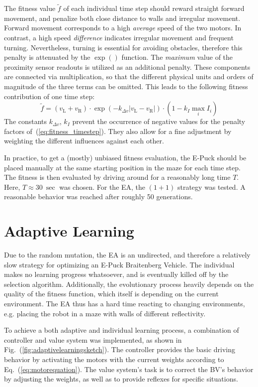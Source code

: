 \documentclass[a4paper]{jacow}
\begin{document}
The fitness value $\tilde{f}$ of each individual time step should reward straight forward movement, and penalize both close distance to walls and irregular movement. Forward movement corresponds to a high \emph{average} speed of the two motors. In contrast, a high speed \emph{difference} indicates irregular movement and frequent turning. Nevertheless, turning is essential for avoiding obstacles, therefore this penalty is attenuated by the $\exp()$ function. The \emph{maximum} value of the proximity sensor readouts is utilized as an additional penalty. These components are connected via multiplication, so that the different physical units and orders of magnitude of the three terms can be omitted. This leads to the following fitness contribution of one time step:
\begin{equation}
	\tilde{f} = \left( v_\mathrm{L} + v_\mathrm{R} \right) \cdot \exp\left( - k_{\Delta v}|v_\mathrm{L}-v_\mathrm{R}| \right) \cdot \left(1- k_{I} \max\limits_i I_i\right)
	\label{eq:fitness_timestep} 
\end{equation}
The constants $k_{\Delta v}$, $k_I$ prevent the occurrence of negative values for the penalty factors of~(\ref{eq:fitness_timestep}). They also allow for a fine adjustment by weighting the different influences against each other.

In practice, to get a (mostly) unbiased fitness evaluation, the E-Puck should be placed manually at the same starting position in the maze for each time step. The fitness is then evaluated by driving around for a reasonably long time $T$. Here, $T\approx\SI{30}{\sec}$ was chosen. For the EA, the $(1+1)$ strategy was tested. A reasonable behavior was reached after roughly 50 generations.


\section{Adaptive Learning}

Due to the random mutation, the EA is an undirected, and therefore a relatively slow strategy for optimizing an E-Puck Braitenberg Vehicle. The individual makes no learning progress whatsoever, and is eventually killed off by the selection algorithm. Additionally, the evolutionary process heavily depends on the quality of the fitness function, which itself is depending on the current environment. The EA thus has a hard time reacting to changing environments, e.g. placing the robot in a maze with walls of different reflectivity.

To achieve a both adaptive and individual learning process, a combination of controller and value system was implemented, as shown in Fig.~(\ref{fig:adaptivelearningsketch}). The controller provides the basic driving behavior by activating the motors with the current weights according to Eq.~(\ref{eq:motorequation}).
The value system's task is to correct the BV's behavior by adjusting the weights, as well as to provide reflexes for specific situations. %
\end{document}

